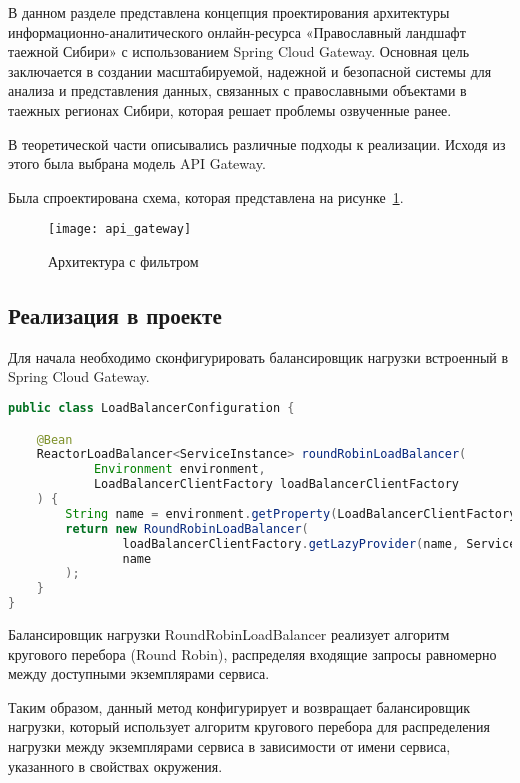 В данном разделе представлена концепция проектирования архитектуры информационно-аналитического онлайн-ресурса «Православный ландшафт таежной Сибири» с использованием Spring Cloud Gateway.
Основная цель заключается в создании масштабируемой, надежной и безопасной системы для анализа и представления данных, связанных с православными объектами в таежных регионах Сибири, которая решает проблемы озвученные ранее.

В теоретической части описывались различные подходы к реализации.
Исходя из этого была выбрана модель API Gateway.

Была спроектирована схема, которая представлена на рисунке~\ref{fig:api_gateway}.

\begin{figure}[htbp]
    \centering
    \texttt{[image: api\_gateway]}
    \caption{Архитектура с фильтром}
    \label{fig:api_gateway}
\end{figure}

\subsection{Реализация в проекте}

Для начала необходимо сконфигурировать балансировщик нагрузки встроенный в Spring Cloud Gateway.

\begin{lstlisting}[language=java]
public class LoadBalancerConfiguration {

    @Bean
    ReactorLoadBalancer<ServiceInstance> roundRobinLoadBalancer(
            Environment environment,
            LoadBalancerClientFactory loadBalancerClientFactory
    ) {
        String name = environment.getProperty(LoadBalancerClientFactory.PROPERTY_NAME);
        return new RoundRobinLoadBalancer(
                loadBalancerClientFactory.getLazyProvider(name, ServiceInstanceListSupplier.class),
                name
        );
    }
}
\end{lstlisting}

Балансировщик нагрузки RoundRobinLoadBalancer реализует алгоритм кругового перебора (Round Robin), распределяя входящие запросы равномерно между доступными экземплярами сервиса.

Таким образом, данный метод конфигурирует и возвращает балансировщик нагрузки, который использует алгоритм кругового перебора для распределения нагрузки между экземплярами сервиса в зависимости от имени сервиса, указанного в свойствах окружения.

